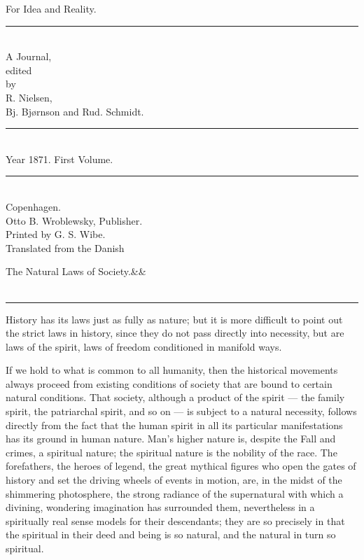 \documentclass[12pt,a4paper,openany]{book}
\newcommand{\opage}[1]{\marginnote{\footnotesize\textit{[#1]}}}
\newcommand{\essayhead}[2]{\begin{center}{\large #1}\ifx&#2&\else\\[0.3em]{\normalsize #2}\fi\\[0.5em]\rule{3em}{0.4pt}\end{center}\medskip\noindent}
\begin{document}
\begin{titlepage}
\begin{center}
\vspace*{3em}
{\Huge For Idea and Reality.}\\[1em]
\rule{8em}{0.4pt}\\[1em]
{\large A Journal,}\\[0.8em]
{\small edited}\\[0.4em]
{\footnotesize by}\\[0.6em]
{\large R. Nielsen,}\\[0.4em]
{\large Bj. Bjørnson and Rud. Schmidt.}\\[1em]
\rule{8em}{0.4pt}\\[0.6em]
{\large Year 1871. First Volume.}\\[0.6em]
\rule{8em}{0.4pt}\\[4em]
Copenhagen.\\[0.4em]
Otto B. Wroblewsky, Publisher.\\[1.5em]
{\small Printed by G. S. Wibe.}\\[3em]
{\small Translated from the Danish}
\end{center}
\end{titlepage}

\essayhead{The Natural Laws of Society.}{}
\setcounter{footnote}{0}%
\opage{289}History has its laws just as fully as nature; but
it is more difficult to point out the strict laws in history,
since they do not pass directly into necessity,
but are laws of the spirit, laws of freedom conditioned in manifold
ways.

If we hold to what is common to all humanity, then the
historical movements always proceed from existing conditions of society
that are bound to certain natural conditions. That
society, although a product of the spirit ---
the family spirit, the patriarchal spirit, and so on --- is
subject to a natural necessity, follows directly from the fact that
the human spirit in all its particular manifestations
has its ground in human nature. Man's higher nature
is, despite the Fall and crimes, a spiritual nature; the spiritual
nature is the nobility of the race. The forefathers, the heroes of legend,
the great mythical figures who open the gates of history
and set the driving wheels of events in motion, are, in the midst of
the shimmering photosphere, the strong radiance of the supernatural
with which a divining, wondering imagination has surrounded
them, nevertheless in a spiritually real sense models for
their descendants; they are so precisely in that the spiritual
\setcounter{footnote}{0}%
\opage{290}in their deed and being is so natural, and the natural
in turn so spiritual.
\end{document}
